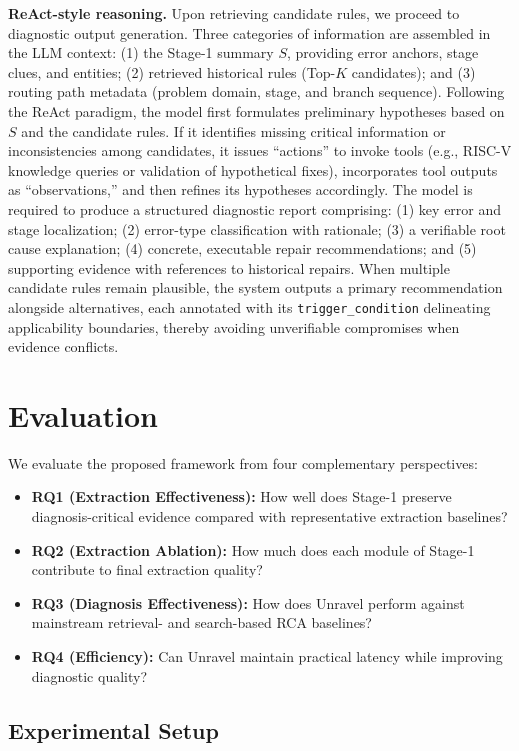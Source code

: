 \documentclass[sigconf]{acmart}
\begin{document}
\textbf{ReAct-style reasoning.} Upon retrieving candidate rules, we proceed to diagnostic output generation. Three categories of information are assembled in the LLM context: (1) the Stage-1 summary $S$, providing error anchors, stage clues, and entities; (2) retrieved historical rules (Top-$K$ candidates); and (3) routing path metadata (problem domain, stage, and branch sequence). Following the ReAct paradigm, the model first formulates preliminary hypotheses based on $S$ and the candidate rules. If it identifies missing critical information or inconsistencies among candidates, it issues ``actions'' to invoke tools (e.g., RISC-V knowledge queries or validation of hypothetical fixes), incorporates tool outputs as ``observations,'' and then refines its hypotheses accordingly. The model is required to produce a structured diagnostic report comprising: (1) key error and stage localization; (2) error-type classification with rationale; (3) a verifiable root cause explanation; (4) concrete, executable repair recommendations; and (5) supporting evidence with references to historical repairs. When multiple candidate rules remain plausible, the system outputs a primary recommendation alongside alternatives, each annotated with its \texttt{trigger\_condition} delineating applicability boundaries, thereby avoiding unverifiable compromises when evidence conflicts.

\section{Evaluation}

We evaluate the proposed framework from four complementary perspectives:
\begin{itemize}[leftmargin=*]
\item \textbf{RQ1 (Extraction Effectiveness):} How well does Stage-1 preserve diagnosis-critical evidence compared with representative extraction baselines?
\item \textbf{RQ2 (Extraction Ablation):} How much does each module of Stage-1 contribute to final extraction quality?
\item \textbf{RQ3 (Diagnosis Effectiveness):} How does Unravel perform against mainstream retrieval- and search-based RCA baselines?
\item \textbf{RQ4 (Efficiency):} Can Unravel maintain practical latency while improving diagnostic quality?
\end{itemize}

\subsection{Experimental Setup}
\end{document}
